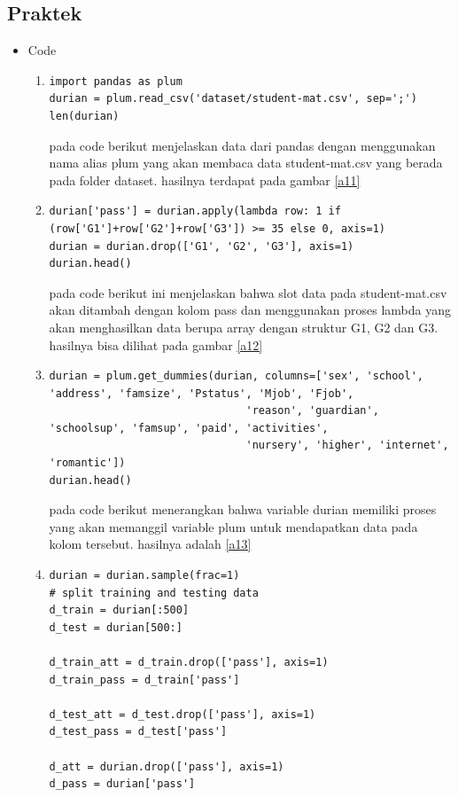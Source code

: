 \subsection {Praktek}
\begin{itemize}
\item Code
\begin{enumerate}
\item
\begin{verbatim}
import pandas as plum
durian = plum.read_csv('dataset/student-mat.csv', sep=';')
len(durian)
\end{verbatim}
\subitem
pada code berikut menjelaskan data dari pandas dengan menggunakan nama alias plum yang akan membaca data student-mat.csv yang berada pada folder dataset. hasilnya terdapat pada gambar \ref{a11}
\item
\begin{verbatim}
durian['pass'] = durian.apply(lambda row: 1 if (row['G1']+row['G2']+row['G3']) >= 35 else 0, axis=1)
durian = durian.drop(['G1', 'G2', 'G3'], axis=1)
durian.head()
\end{verbatim}
\subitem
pada code berikut ini menjelaskan bahwa slot data pada student-mat.csv akan ditambah dengan kolom pass dan menggunakan proses lambda yang akan menghasilkan data berupa array dengan struktur G1, G2 dan G3. hasilnya bisa dilihat pada gambar \ref{a12}
\item 
\begin{verbatim}
durian = plum.get_dummies(durian, columns=['sex', 'school', 'address', 'famsize', 'Pstatus', 'Mjob', 'Fjob', 
                               'reason', 'guardian', 'schoolsup', 'famsup', 'paid', 'activities',
                               'nursery', 'higher', 'internet', 'romantic'])
durian.head()

\end{verbatim}
\subitem
pada code berikut menerangkan bahwa variable durian memiliki proses yang akan memanggil variable plum untuk mendapatkan data pada kolom tersebut. hasilnya adalah \ref{a13}
\item
\begin{verbatim}
durian = durian.sample(frac=1)
# split training and testing data
d_train = durian[:500]
d_test = durian[500:]

d_train_att = d_train.drop(['pass'], axis=1)
d_train_pass = d_train['pass']

d_test_att = d_test.drop(['pass'], axis=1)
d_test_pass = d_test['pass']

d_att = durian.drop(['pass'], axis=1)
d_pass = durian['pass']


\end{verbatim}
\end{enumerate}
\end{itemize}
